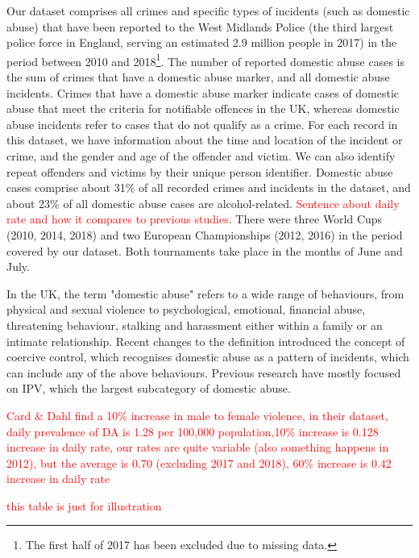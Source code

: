\documentclass[12pt, letterpaper]{article}
\begin{document}
Our dataset comprises all crimes and specific types of incidents (such as domestic abuse) that have been reported to the West Midlands Police (the third largest police force in England\autocite{Homeoffice}, serving an estimated 2.9 million people in 2017\autocite{populationfigure}) in the period between 2010 and 2018\footnote{The first half of 2017 has been excluded due to missing data.}. The number of reported domestic abuse cases is the sum of crimes that have a domestic abuse marker, and all domestic abuse incidents. Crimes that have a domestic abuse marker indicate cases of domestic abuse that meet the criteria for notifiable offences in the UK, whereas domestic abuse incidents refer to cases that do not qualify as a crime. For each record in this dataset, we have information about the time and location of the incident or crime, and the gender and age of the offender and victim. We can also identify repeat offenders and victims by their unique person identifier. Domestic abuse cases comprise about 31\% of all recorded crimes and incidents in the dataset, and about 23\% of all domestic abuse cases are alcohol-related. \textcolor{red}{Sentence about daily rate and how it compares to previous studies}. There were three World Cups (2010, 2014, 2018) and two European Championships (2012, 2016) in the period covered by our dataset. Both tournaments take place in the months of June and July.

In the UK, the term "domestic abuse" refers to a wide range of behaviours, from physical and sexual violence to psychological, emotional, financial abuse, threatening behaviour, stalking and harassment either within a family or an intimate relationship\autocite{ONS}. Recent changes to the definition introduced the concept of coercive control, which recognises domestic abuse as a pattern of incidents, which can include any of the above behaviours. Previous research have mostly focused on IPV, which the largest subcategory of domestic abuse. 




\textcolor{red}{Card \& Dahl find a 10\% increase in male to female violence, in their dataset, daily prevalence of DA is 1.28 per 100,000 population,10\% increase is 0.128 increase in daily rate, our rates are quite variable (also something happens in 2012), but the average is 0.70 (excluding 2017 and 2018), 60\% increase is 0.42 increase in daily rate}
 
\textcolor{red}{this table is just for illustration}
\end{document}
